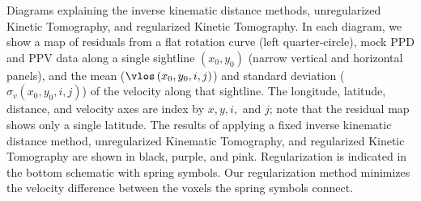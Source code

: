 \label{fig:diagram} Diagrams explaining the inverse kinematic distance methods, unregularized Kinetic Tomography, and regularized Kinetic Tomography. In each diagram, we show a map of residuals from a flat rotation curve (left quarter-circle), mock PPD and PPV data along a single sightline $\left(x_0, y_0\right)$ (narrow vertical and horizontal panels), and the mean ($\vlos\left(x_0, y_0, i, j\right)$) and standard deviation ($\sigma_v\left(x_0, y_0, i, j\right)$) of the velocity along that sightline. The longitude, latitude, distance, and velocity axes are index by $x, y, i,$ and $j$; note that the residual map shows only a single latitude. The results of applying a fixed inverse kinematic distance method, unregularized Kinematic Tomography, and regularized Kinetic Tomography are shown in black, purple, and pink. Regularization is indicated in the bottom schematic with spring symbols. Our regularization method minimizes the velocity difference between the voxels the spring symbols connect. 